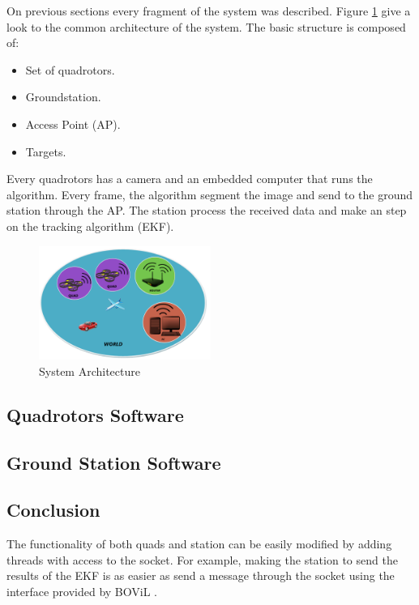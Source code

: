On previous sections every fragment of the system was described. Figure \ref{fig:System_Architecture} give a look to the common architecture of the system. The basic structure is composed of:

\begin{itemize}
  \item Set of quadrotors.
  \item Groundstation.
  \item Access Point (AP).
  \item Targets.
\end{itemize}

Every quadrotors has a camera and an embedded computer that runs the algorithm. Every frame, the algorithm segment the image and send to the ground station through the AP. The station process the received data and make an step on the tracking algorithm (EKF).

\begin{figure}[hb]
	\centering
	\includegraphics[width=0.50\textwidth,natwidth=220,natheight=1467]{../Images/c2/Architecture.png}
	\caption{System Architecture}
	\label{fig:System_Architecture}
\end{figure}

\subsection{Quadrotors Software}
\subsection{Ground Station Software}
\subsection{Conclusion}
The functionality of both quads and station can be easily modified by adding threads with access to the socket. For example, making the station to send the results of the EKF is as easier as send a message through the socket using the interface provided by BOViL \cite{BOViL}. 

